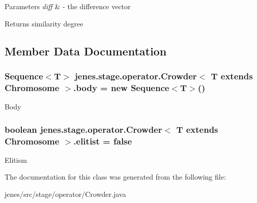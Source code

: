 \begin{DoxyParams}{Parameters}
{\em diff} & -\/ the difference vector \\
\hline
\end{DoxyParams}
\begin{DoxyReturn}{Returns}
similarity degree 
\end{DoxyReturn}


\subsection{Member Data Documentation}
\hypertarget{classjenes_1_1stage_1_1operator_1_1_crowder_3_01_t_01extends_01_chromosome_01_4_a81522e76967039395a3567c866fa59ed}{
\subsubsection[{body}]{\setlength{\rightskip}{0pt plus 5cm}Sequence$<$T$>$ jenes.\-stage.\-operator.\-Crowder$<$ T extends Chromosome $>$.body = new Sequence$<$T$>$()\hspace{0.3cm}{\ttfamily [protected]}}}\label{classjenes_1_1stage_1_1operator_1_1_crowder_3_01_t_01extends_01_chromosome_01_4_a81522e76967039395a3567c866fa59ed}
Body \hypertarget{classjenes_1_1stage_1_1operator_1_1_crowder_3_01_t_01extends_01_chromosome_01_4_a5337bdf3f7d5ad8d6e09daaa3bb0636b}{
\subsubsection[{elitist}]{\setlength{\rightskip}{0pt plus 5cm}boolean jenes.\-stage.\-operator.\-Crowder$<$ T extends Chromosome $>$.elitist = false\hspace{0.3cm}{\ttfamily [protected]}}}\label{classjenes_1_1stage_1_1operator_1_1_crowder_3_01_t_01extends_01_chromosome_01_4_a5337bdf3f7d5ad8d6e09daaa3bb0636b}
Elitism 

The documentation for this class was generated from the following file\-:\begin{DoxyCompactItemize}
\item 
jenes/src/stage/operator/Crowder.\-java\end{DoxyCompactItemize}
